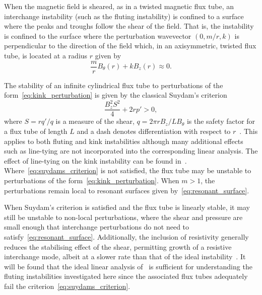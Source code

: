 \documentclass[12pt]{article}
\begin{document}
When the magnetic field is sheared, as in a twisted magnetic flux tube, an interchange instability (such as the fluting instability) is confined to a surface where the peaks and troughs follow the shear of the field. That is, the instability is confined to the surface where the perturbation wavevector $(0, m/r, k)$ is perpendicular to the direction of the field which, in an axisymmetric, twisted flux tube, is located at a radius $r$ given by
\begin{equation}
  \label{eq:resonant_surface}
\frac{m}{r} B_{\theta}(r) + kB_z(r) \approx 0.
\end{equation}

The stability of an infinite cylindrical flux tube to perturbations of the form~\eqref{eq:kink_perturbation} is given by the classical Suydam's criterion
\begin{equation}
  \label{eq:suydams_criterion}
\frac{B_z^2 S^2}{4} + 2 r p' > 0,
\end{equation}
where $S = r q'/q$ is a measure of the shear, $q = 2\pi r B_z / L B_{\theta}$ is the safety factor for a flux tube of length $L$ and a dash denotes differentiation with respect to $r$~\cite{mikhailovskiiInstabilitiesConfinedPlasma1998}. This applies to both fluting and kink instabilities although many additional effects such as line-tying are not incorporated into the corresponding linear analysis. The effect of line-tying on the kink instability can be found in~\cite{hoodKinkInstabilitySolar1979}. Where~\eqref{eq:suydams_criterion} is not satisfied, the flux tube may be unstable to perturbations of the form~\eqref{eq:kink_perturbation}. When $m>1$, the perturbations remain local to resonant surfaces given by~\eqref{eq:resonant_surface}.

When Suydam's criterion is satisfied and the flux tube is linearly stable, it may still be unstable to non-local perturbations, where the shear and pressure are small enough that interchange perturbations do not need to satisfy~\eqref{eq:resonant_surface}. Additionally, the inclusion of resistivity generally reduces the stabilising effect of the shear, permitting growth of a resistive interchange mode, albeit at a slower rate than that of the ideal instability~\cite{mikhailovskiiInstabilitiesConfinedPlasma1998}. It will be found that the ideal linear analysis of~\cite{mikhailovskiiInstabilitiesConfinedPlasma1998} is sufficient for understanding the fluting instabilities investigated here since the associated flux tubes adequately fail the criterion~\eqref{eq:suydams_criterion}.
\end{document}
